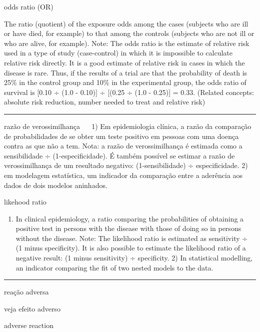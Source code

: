 \documentclass[
  openany]{book}
\providecommand{\tightlist}{%
  \setlength{\itemsep}{0pt}\setlength{\parskip}{0pt}}
\begin{document}
odds ratio (OR)

The ratio (quotient) of the exposure odds among the cases (subjects who are ill or have died, for example) to that among the controls (subjects who are not ill or who are alive, for example). Note: The odds ratio is the estimate of relative risk used in a type of study (case-control) in which it is impossible to calculate relative risk directly. It is a good estimate of relative risk in cases in which the disease is rare. Thus, if the results of a trial are that the probability of death is 25\% in the control group and 10\% in the experimental group, the odds ratio of survival is {[}0.10 ÷ (1.0 - 0.10){]} ÷ {[}(0.25 ÷ (1.0 - 0.25){]} = 0.33. (Related concepts: absolute risk reduction, number needed to treat and relative risk)

\begin{center}\rule{0.5\linewidth}{0.5pt}\end{center}

razão de verossimilhança
 
1) Em epidemiologia clínica, a razão da comparação de probabilidades de se obter um teste positivo em pessoas com uma doença contra as que não a tem. Nota: a razão de verossimilhança é estimada como a sensibilidade ÷ (1-especificidade). É também possível se estimar a razão de verossimilhança de um resultado negativo: (1-sensibilidade) ÷ especificidade. 2) em modelagem estatística, um indicador da comparação entre a aderência aos dados de dois modelos aninhados.

likehood ratio

\begin{enumerate}
\def\labelenumi{\arabic{enumi})}
\tightlist
\item
  In clinical epidemiology, a ratio comparing the probabilities of obtaining a positive test in persons with the disease with those of doing so in persons without the disease. Note: The likelihood ratio is estimated as sensitivity ÷ (1 minus specificity). It is also possible to estimate the likelihood ratio of a negative result: (1 minus sensitivity) ÷ specificity. 2) In statistical modelling, an indicator comparing the fit of two nested models to the data.
\end{enumerate}

\begin{center}\rule{0.5\linewidth}{0.5pt}\end{center}

reação adversa

veja efeito adverso

adverse reaction
\end{document}
